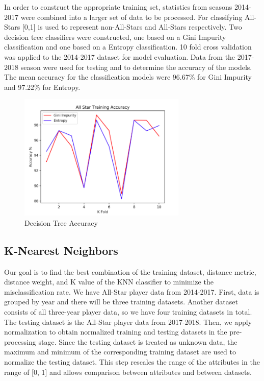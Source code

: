 \documentclass{article}
\begin{document}
In order to construct the appropriate training set, statistics from seasons 2014-2017 were combined into a larger set of data to be processed. For classifying All-Stars [0,1] is used to represent non-All-Stars and All-Stars respectively. Two decision tree classifiers were constructed, one based on a Gini Impurity classification and one based on a Entropy classification. 10 fold cross validation was applied to the 2014-2017 dataset for model evaluation. Data from the 2017-2018 season were used for testing and to determine the accuracy of the models. The mean accuracy for the classification models were 96.67\% for Gini Impurity and 97.22\% for Entropy.
\begin{figure}[hbt!]
  \centering
  \includegraphics[width=8cm]{decisiontree.png}
  \caption{Decision Tree Accuracy}
\end{figure}

\subsection{K-Nearest Neighbors}
Our goal is to find the best combination of the training dataset, distance metric, distance weight, and K value of the KNN classifier to minimize the misclassification rate. We have All-Star player data from 2014-2017. First, data is grouped by year and there will be three training datasets. Another dataset consists of all three-year player data, so we have four training datasets in total. The testing dataset is the All-Star player data from 2017-2018. Then, we apply normalization to obtain normalized training and testing datasets in the pre-processing stage. Since the testing dataset is treated as unknown data, the maximum and minimum of the corresponding training dataset are used to normalize the testing dataset. This step rescales the range of the attributes in the range of [0, 1] and allows comparison between attributes and between datasets. 
\end{document}
